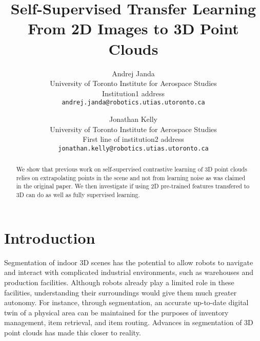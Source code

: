 \documentclass[10pt,twocolumn,letterpaper]{article}
\begin{document}
\title{Self-Supervised Transfer Learning From 2D Images to 3D Point Clouds}

\author{Andrej Janda\\
University of Toronto Institute for Aerospace Studies\\
Institution1 address\\
{\tt\small andrej.janda@robotics.utias.utoronto.ca}
\and
Jonathan Kelly\\
University of Toronto Institute for Aerospace Studies\\
First line of institution2 address\\
{\tt\small jonathan.kelly@robotics.utias.utoronto.ca}
}
\maketitle

\begin{abstract}
    We show that previous work \cite{xie2020pointcontrast} on self-supervised contrastive learning of 3D point clouds relies on extrapolating points in the scene and not from learning noise as was claimed in the original paper. We then investigate if using 2D pre-trained features transfered to 3D can do as well as fully supervised learning.
\end{abstract}

\section{Introduction}
\label{sec:intro}

Segmentation of indoor 3D scenes has the potential to allow robots to navigate and interact with complicated industrial environments, such as warehouses and production facilities. Although robots already play a limited role in these facilities, understanding their surroundings would give them much greater autonomy. For instance, through segmentation, an accurate up-to-date digital twin of a physical area can be maintained for the purposes of inventory management, item retrieval, and item routing. Advances in segmentation of 3D point clouds \cite{choy20194d} has made this closer to reality.
\end{document}
